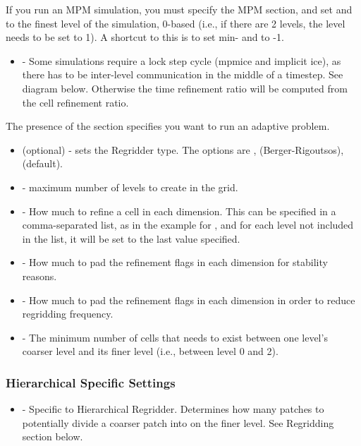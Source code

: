 If you run an MPM simulation, you must specify the MPM section, and
set  and  to the finest level of the
simulation, 0-based (i.e., if there are 2 levels, the level needs to
be set to 1). A shortcut to this is to set min- and  to
-1.
\begin{itemize}
\item {} - Some simulations require a lock step cycle (mpmice
  and implicit ice), as there has to be inter-level communication in
  the middle of a timestep. See  diagram below. Otherwise the
  time refinement ratio will be computed from the cell refinement
  ratio.
\end{itemize}

The presence of the  section specifies you want to run an
adaptive problem.
\begin{itemize}
  \item {} (optional) - sets the Regridder type. The options are
   ,  (Berger-Rigoutsos),  (default).
 \item {} - maximum number of levels to create in the grid. 
 \item {} - How much to refine a cell in each
   dimension. This can be specified in a comma-separated list, as in
   the example for , and for each level not
   included in the list, it will be set to the last value specified.
 \item {} - How much to pad the refinement flags
   in each dimension for stability reasons.
 \item {} - How much to pad the refinement flags in
   each dimension in order to reduce regridding frequency.
 \item {} - The minimum number of cells that needs to
   exist between one level's coarser level and its finer level (i.e.,
   between level 0 and 2).
\end{itemize}

\subsubsection{Hierarchical Specific Settings}
\begin{itemize}
\item {} - Specific to Hierarchical
  Regridder. Determines how many patches to potentially divide a
  coarser patch into on the finer level. See Regridding section below.
\end{itemize}


